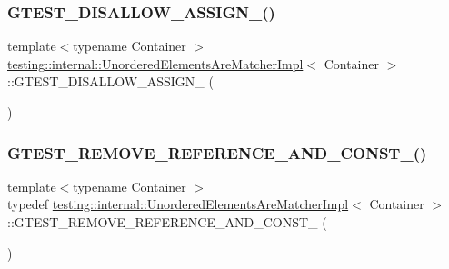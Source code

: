 \subsubsection{\texorpdfstring{G\+T\+E\+S\+T\+\_\+\+D\+I\+S\+A\+L\+L\+O\+W\+\_\+\+A\+S\+S\+I\+G\+N\+\_\+()}{GTEST\_DISALLOW\_ASSIGN\_()}}
{\footnotesize\ttfamily template$<$typename Container $>$ \\
\hyperlink{classtesting_1_1internal_1_1UnorderedElementsAreMatcherImpl}{testing\+::internal\+::\+Unordered\+Elements\+Are\+Matcher\+Impl}$<$ Container $>$\+::G\+T\+E\+S\+T\+\_\+\+D\+I\+S\+A\+L\+L\+O\+W\+\_\+\+A\+S\+S\+I\+G\+N\+\_\+ (\begin{DoxyParamCaption}\item[{\hyperlink{classtesting_1_1internal_1_1UnorderedElementsAreMatcherImpl}{Unordered\+Elements\+Are\+Matcher\+Impl}$<$ Container $>$}]{ }\end{DoxyParamCaption})\hspace{0.3cm}{\ttfamily [private]}}

\mbox{\label{classtesting_1_1internal_1_1UnorderedElementsAreMatcherImpl_a6e8b7d421741a66ee7f2ebff7372897e}} 
\subsubsection{\texorpdfstring{G\+T\+E\+S\+T\+\_\+\+R\+E\+M\+O\+V\+E\+\_\+\+R\+E\+F\+E\+R\+E\+N\+C\+E\+\_\+\+A\+N\+D\+\_\+\+C\+O\+N\+S\+T\+\_\+()}{GTEST\_REMOVE\_REFERENCE\_AND\_CONST\_()}}
{\footnotesize\ttfamily template$<$typename Container $>$ \\
typedef \hyperlink{classtesting_1_1internal_1_1UnorderedElementsAreMatcherImpl}{testing\+::internal\+::\+Unordered\+Elements\+Are\+Matcher\+Impl}$<$ Container $>$\+::G\+T\+E\+S\+T\+\_\+\+R\+E\+M\+O\+V\+E\+\_\+\+R\+E\+F\+E\+R\+E\+N\+C\+E\+\_\+\+A\+N\+D\+\_\+\+C\+O\+N\+S\+T\+\_\+ (\begin{DoxyParamCaption}\item[{Container}]{ }\end{DoxyParamCaption})}

